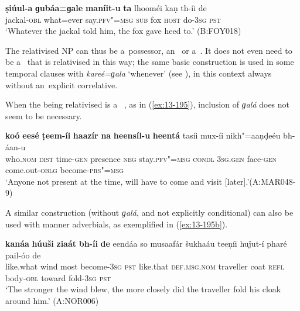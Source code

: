 \ex
\label{ex:13-194}
\gll \textbf{ṣiúul-a} \textbf{ɡubáa=ɡale} \textbf{maníit-u} \textbf{ta} lhooméi kaṇ  th-íi de \\
jackal-\textsc{obl} what=ever say.\textsc{pfv"=msg} \textsc{sub} fox \textsc{host} do-\textsc{3sg} \textsc{pst} \\
\glt `Whatever the jackal told him, the fox gave heed to.' (B:FOY018) 
\z



The relativised NP can thus be a~possessor, an~  or a~. It does not even need to be a~  that is relativised in this way; the same basic construction is used in some temporal clauses with \textit{kareé=ɡala} `whenever' (see ), in this context always without an~explicit correlative.


When the   being relativised is a~ , as in (\ref{ex:13-195}), inclusion of \textit{ɡalá} does not seem to be necessary. 

\begin{exe}
\ex
\label{ex:13-195}
\gll \textbf{koó} \textbf{eesé} \textbf{ṭeem-íi} \textbf{haazír} \textbf{na} \textbf{heensíl-u} \textbf{ heentá} tasíi mux-íi nikh"=aaṇḍeéu bh-áan-u \\
who.\textsc{nom} \textsc{dist} time-\textsc{gen} presence \textsc{neg} stay.\textsc{pfv"=msg}  \textsc{condl } \textsc{3sg.gen} face-\textsc{gen} come.out-\textsc{oblg} become-\textsc{prs"=msg} \\
\glt `Anyone not present at the time, will have to come and visit [later].'\newline (A:MAR048-9)
\end{exe}

A similar construction (without \textit{ɡalá}, and not explicitly conditional) can also be used with manner adverbials, as exemplified in (\ref{ex:13-195b}).

\begin{exe}
\ex
\label{ex:13-195b}
\gll \textbf{kanáa} \textbf{húuši} \textbf{ziaát} \textbf{bh-íi} \textbf{de} eendáa so musaafár šukhaáu teeṇíi huǰut-í pharé pail-óo de\\
like.what wind most become-\textsc{3sg} \textsc{pst} like.that \textsc{def.msg.nom} traveller coat \textsc{refl} body-\textsc{obl} toward fold-\textsc{3sg} \textsc{pst} \\
\glt `The stronger the wind blew, the more closely did the traveller fold his cloak around him.' (A:NOR006)
\end{exe}


